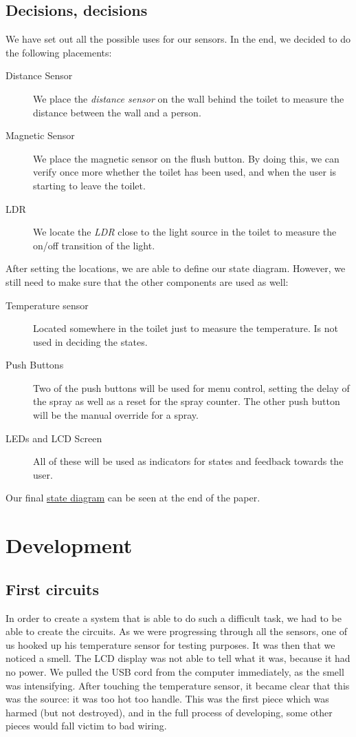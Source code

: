 \documentclass[a4paper, 12pt]{article}
\begin{document}
\subsection{Decisions, decisions}

We have set out all the possible uses for our sensors. In the end, we decided to do the following placements:
\begin{description}
\item[Distance Sensor] We place the \textit{distance sensor} on the wall behind the toilet to measure the distance between the wall and a person.
\item[Magnetic Sensor] We place the magnetic sensor on the flush button. By doing this, we can verify once more whether the toilet has been used, and when the user is starting to leave the toilet.
\item[LDR] We locate the \textit{LDR} close to the light source in the toilet to measure the on/off transition of the light.
\end{description}

\noindent After setting the locations, we are able to define our state diagram. However, we still need to make sure that the other components are used as well:
\begin{description}
\item[Temperature sensor] Located somewhere in the toilet just to measure the temperature. Is not used in deciding the states.
\item[Push Buttons] Two of the push buttons will be used for menu control, setting the delay of the spray as well as a reset for the spray counter. The other push button will be the manual override for a spray.
\item[LEDs and LCD Screen] All of these will be used as indicators for states and feedback towards the user.
\end{description}

Our final \hyperref[fig:stateDia]{state diagram} can be seen at the end of the paper.

\section{Development}
\subsection{First circuits}
In order to create a system that is able to do such a difficult task, we had to be able to create the circuits. As we were progressing through all the sensors, one of us hooked up his temperature sensor for testing purposes. It was then that we noticed a smell. The LCD display was not able to tell what it was, because it had no power. We pulled the USB cord from the computer immediately, as the smell was intensifying. After touching the temperature sensor, it became clear that this was the source: it was too hot too handle. This was the first piece which was harmed (but not destroyed), and in the full process of developing, some other pieces would fall victim to bad wiring.
\end{document}
